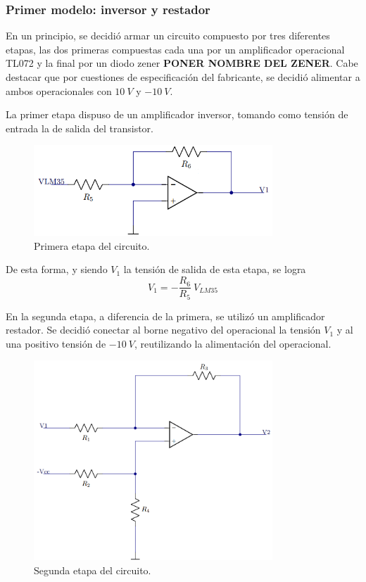 \documentclass[a4paper]{article}
\begin{document}
\subsubsection{Primer modelo: inversor y restador}

En un principio, se decidió armar un circuito compuesto por tres diferentes etapas, las dos primeras compuestas cada una por un amplificador operacional TL072 y la final por un diodo zener \textbf{PONER NOMBRE DEL ZENER}. Cabe destacar que por cuestiones de especificación del fabricante, se decidió alimentar a ambos operacionales con $10 \ V$ y $-10 \ V$.

La primer etapa dispuso de un amplificador inversor, tomando como tensión de entrada la de salida del transistor.

\begin{figure}[H]
	\centering
	\includegraphics[width=0.8\textwidth]{Ejercicio6/Imagenes/CircuitoEtapa1-M1.png}
\caption{Primera etapa del circuito.}
	\label{fig:cir1-M1}
\end{figure}

De esta forma, y siendo $V_1$ la tensión de salida de esta etapa, se logra
\[
	V_1 = -\frac{R_6}{R_5} \ V_{LM35}
\]

En la segunda etapa, a diferencia de la primera, se utilizó un amplificador restador. Se decidió conectar al borne negativo del operacional la tensión $V_1$ y al  una positivo tensión de $- 10 \ V$, reutilizando la alimentación del operacional.

\begin{figure}[H]
	\centering
	\includegraphics[width=0.8\textwidth]{Ejercicio6/Imagenes/CircuitoEtapa2-M1.png}
	\caption{Segunda etapa del circuito.}
	\label{fig:cir2-M1}
\end{figure}
\end{document}
